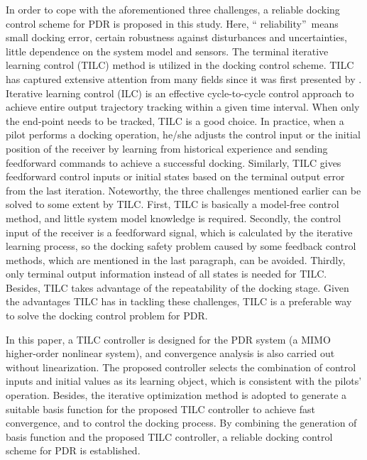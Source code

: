 In order to cope with the aforementioned three challenges, a reliable docking
control scheme for PDR is proposed in this study. Here, \textquotedblleft
reliability\textquotedblright \ means small docking error, certain robustness
against disturbances and uncertainties, little dependence on the system model
and sensors. The terminal iterative
learning control (TILC) method is utilized in the docking control scheme. TILC
has captured extensive attention from many fields since it was first presented
by \cite{Xu1999Terminal}. Iterative learning control (ILC)
\cite{Chen2012Iterative} is an effective cycle-to-cycle control approach to
achieve entire output trajectory tracking within a given time interval. When
only the end-point needs to be tracked, TILC is a good choice. In practice,
when a pilot performs a docking operation, he/she adjusts the control input or
the initial position of the receiver by learning from historical experience
and sending feedforward commands to achieve a successful docking. Similarly,
TILC gives feedforward control inputs or initial states based on the terminal output error
from the last iteration. Noteworthy, the three challenges mentioned earlier can be
solved to some extent by TILC. First, TILC is basically a model-free control
method, and little system model knowledge is required. Secondly, the control
input of the receiver is a feedforward signal, which is calculated by the
iterative learning process, so the docking safety problem caused by some
feedback control methods, which are mentioned in the last paragraph, can be
avoided. Thirdly, only terminal output information instead of all states is
needed for TILC. Besides, TILC takes advantage of the repeatability of the
docking stage. Given the advantages TILC has in tackling these challenges,
TILC is a preferable way to solve the docking control problem for PDR.

In this paper, a TILC controller is designed for the PDR system (a MIMO
higher-order nonlinear system), and convergence analysis is also carried out
without linearization. The proposed controller selects the combination of
control inputs and initial values as its learning object, which is consistent
with the pilots' operation. Besides, the iterative optimization method is
adopted to generate a suitable basis function for the proposed TILC controller
to achieve fast convergence, and to control the docking process. By combining the generation of basis function and
the proposed TILC controller, a reliable docking control scheme for PDR is established.

